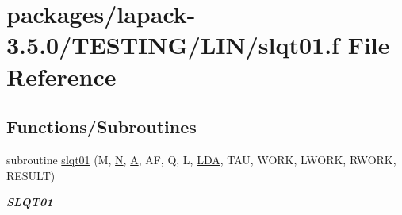 \hypertarget{slqt01_8f}{}\section{packages/lapack-\/3.5.0/\+T\+E\+S\+T\+I\+N\+G/\+L\+I\+N/slqt01.f File Reference}
\label{slqt01_8f}
\subsection*{Functions/\+Subroutines}
\begin{DoxyCompactItemize}
\item 
subroutine \hyperlink{group__single__lin_gaae0b07fde995a5da80d8b88da702911e}{slqt01} (M, \hyperlink{polmisc_8c_a0240ac851181b84ac374872dc5434ee4}{N}, \hyperlink{classA}{A}, A\+F, Q, L, \hyperlink{example__user_8c_ae946da542ce0db94dced19b2ecefd1aa}{L\+D\+A}, T\+A\+U, W\+O\+R\+K, L\+W\+O\+R\+K, R\+W\+O\+R\+K, R\+E\+S\+U\+L\+T)
\begin{DoxyCompactList}\small\item\em {\bfseries S\+L\+Q\+T01} \end{DoxyCompactList}\end{DoxyCompactItemize}
